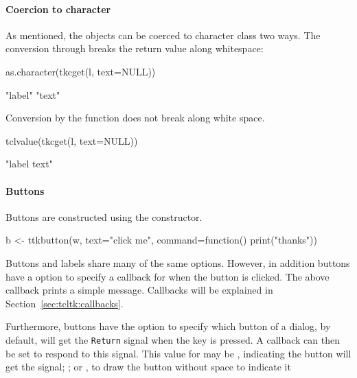 \paragraph{Coercion to character}
As mentioned, the  objects can be coerced to character class two ways.
The conversion through  breaks the return value along whitespace:
\begin{Schunk}
\begin{Sinput}
 as.character(tkcget(l, text=NULL))
\end{Sinput}
\begin{Soutput}
[1] "label" "text" 
\end{Soutput}
\end{Schunk}
Conversion by the  function does not break along white
space.
\begin{Schunk}
\begin{Sinput}
 tclvalue(tkcget(l, text=NULL))
\end{Sinput}
\begin{Soutput}
[1] "label text"
\end{Soutput}
\end{Schunk}



\paragraph{Buttons}
Buttons are constructed using the  constructor.
\begin{Schunk}
\begin{Sinput}
 b <- ttkbutton(w, text="click me", command=function() print("thanks"))
\end{Sinput}
\end{Schunk}

Buttons and labels share many of the same options. However, in addition buttons
have a  option to specify a callback for
when the button is clicked. The above callback prints a simple message. Callbacks
will be explained in Section~\ref{sec:tcltk:callbacks}. 

Furthermore, buttons have the option  to
specify which button of a dialog, by default, will get the
\texttt{Return} signal when the  key is pressed. A callback
can then be set to respond to this signal. This value for
 may be , indicating the button will get
the signal; ; or , to draw the button
without space to indicate it


